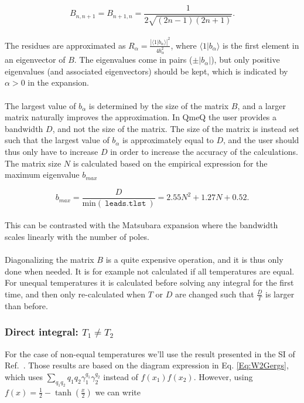 \documentclass{article}
\newcommand{\ket}[1]{\ensuremath{|#1\rangle}}
\begin{document}
\begin{equation}
    B_{n,n+1} = B_{n+1,n}=\frac{1}{2\sqrt{(2n-1)(2n+1)}}.
\end{equation}
\\
The residues are approximated as $R_\alpha=\frac{|\langle 1\ket{b_\alpha}|^2}{4b_\alpha^2}$, where $\langle 1\ket{b_\alpha}$ is the first element in an eigenvector of $B$. The eigenvalues come in pairs ($\pm|b_\alpha|$), but only positive eigenvalues (and associated eigenvectors) should be kept, which is indicated by $\alpha>0$ in the expansion. 
\\
\\
The largest value of $b_\alpha$ is determined by the size of the matrix $B$, and a larger matrix naturally improves the approximation. In QmeQ the user provides a bandwidth $D$, and not the size of the matrix. The size of the matrix is instead set such that the largest value of $b_\alpha$ is approximately equal to $D$, and the user should thus only have to increase $D$ in order to increase the accuracy of the calculations. The matrix size $N$ is calculated based on the empirical expression for the maximum eigenvalue $b_{max}$

\begin{equation}
    b_{max} = \frac{D}{\text{min}(\ \texttt{leads.tlst}\ )}= 2.55N^{2} + 1.27N + 0.52.
\end{equation}
\\
This can be contrasted with the Matsubara expansion where the bandwidth scales linearly with the number of poles.
\\
\\
Diagonalizing the matrix $B$ is a quite expensive operation, and it is thus only done when needed. It is for example not calculated if all temperatures are equal. For unequal temperatures it is calculated before solving any integral for the first time, and then only re-calculated when $T$ or $D$ are changed such that $\frac{D}{T}$ is larger than before.
\subsubsection{Direct integral: $T_1\ne T_2$}

For the case of non-equal temperatures we'll use the result presented in the SI of Ref.~\cite{gergs2018spin}. Those results are based on the diagram expression in Eq. \ref{Eq:W2Gergs}, which uses $\sum_{q_1q_2}q_1q_2\gamma^{q_1}_1\gamma^{q_2}_2$ instead of $f(x_1)f(x_2)$. However, using $f(x)=\frac{1}{2}-\tanh\left(\frac{x}{2}\right)$ we can write
\end{document}
